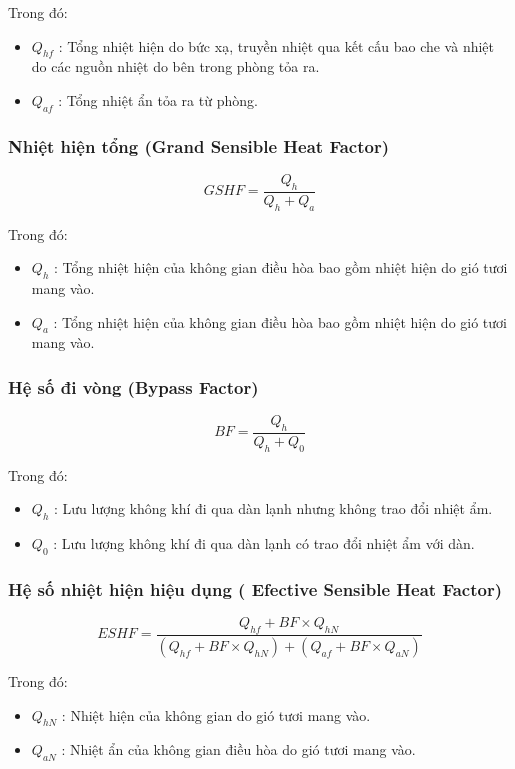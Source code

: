 Trong đó:
\begin{itemize}
	\item $Q_{hf}$ : Tổng nhiệt hiện do bức xạ, truyền nhiệt qua kết cấu bao che và nhiệt do các nguồn nhiệt do bên trong phòng tỏa ra.
	\item $Q_{af}$ : Tổng nhiệt ẩn tỏa ra từ phòng.
\end{itemize}
\subsubsection{Nhiệt hiện tổng (Grand Sensible Heat Factor)}
\begin{equation*}
	GSHF = \dfrac{Q_{h}}{Q_{h} + Q_{a}}
\end{equation*}

Trong đó:
\begin{itemize}
	\item $Q_{h}$ : Tổng nhiệt hiện của không gian điều hòa bao gồm nhiệt hiện do gió tươi mang vào.
	\item $Q_{a}$ : Tổng nhiệt hiện của không gian điều hòa bao gồm nhiệt hiện do gió tươi mang vào.
\end{itemize}
\subsubsection{Hệ số đi vòng (Bypass Factor)}
\begin{equation*}
	BF = \dfrac{Q_{h}}{Q_{h} + Q_{0}}
\end{equation*}

Trong đó:
\begin{itemize}
	\item $Q_{h}$ : Lưu lượng không khí đi qua dàn lạnh nhưng không trao đổi nhiệt ẩm.
	\item $Q_{0}$ : Lưu lượng không khí đi qua dàn lạnh có trao đổi nhiệt ẩm với dàn.
\end{itemize}
\subsubsection{Hệ số nhiệt hiện hiệu dụng ( Efective Sensible Heat Factor)}
\begin{equation*}
	ESHF = \dfrac{Q_{hf} + BF\times Q_{hN}}{(Q_{hf} + BF\times Q_{hN}) + (Q_{af} + BF\times Q_{aN})}
\end{equation*}

Trong đó:
\begin{itemize}
	\item $Q_{hN}$ : Nhiệt hiện của không gian do gió tươi mang vào.
	\item $Q_{aN}$ : Nhiệt ẩn của không gian điều hòa do gió tươi mang vào.
\end{itemize}

